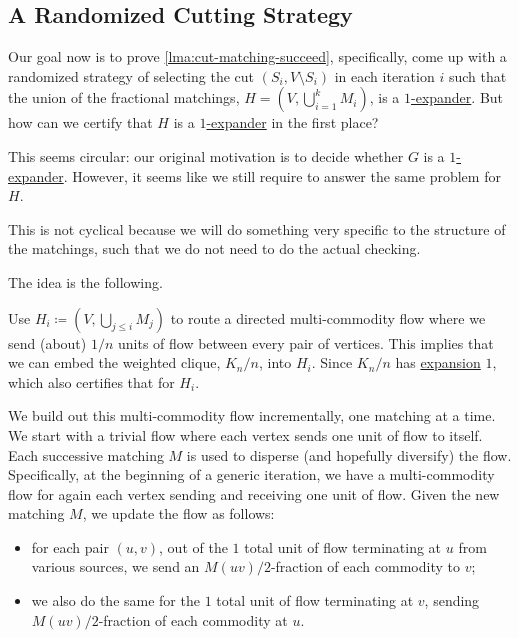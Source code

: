 \subsection{A Randomized Cutting Strategy}
Our goal now is to prove \autoref{lma:cut-matching-succeed}, specifically, come up with a randomized strategy of selecting the cut \((S_i, V\setminus S_i)\) in each iteration \(i\) such that the union of the fractional matchings, \(H = (V, \bigcup_{i=1}^{k} M_i)\), is a \hyperref[def:expander]{\(1\)-expander}. But how can we certify that \(H\) is a \hyperref[def:expander]{\(1\)-expander} in the first place?

\begin{problem*}
	This seems circular: our original motivation is to decide whether \(G\) is a \hyperref[def:expander]{\(1\)-expander}. However, it seems like we still require to answer the same problem for \(H\).
\end{problem*}
\begin{answer}
	This is not cyclical because we will do something very specific to the structure of the matchings, such that we do not need to do the actual checking.
\end{answer}

The idea is the following.

\begin{intuition}
	Use \(H_i \coloneqq (V, \bigcup_{j \leq i} M_j)\) to route a directed multi-commodity flow where we send (about) \(1 / n\) units of flow between every pair of vertices. This implies that we can embed the weighted clique, \(K_n / n\), into \(H_i\). Since \(K_n / n\) has \hyperref[def:expansion]{expansion} \(1\), which also certifies that for \(H_i\).
\end{intuition}

We build out this multi-commodity flow incrementally, one matching at a time. We start with a trivial flow where each vertex sends one unit of flow to itself. Each successive matching \(M\) is used to disperse (and hopefully diversify) the flow. Specifically, at the beginning of a generic iteration, we have a multi-commodity flow for again each vertex sending and receiving one unit of flow. Given the new matching \(M\), we update the flow as follows:
\begin{itemize}
	\item for each pair \((u, v)\), out of the \(1\) total unit of flow terminating at \(u\) from various sources, we send an \(M(uv) / 2\)-fraction of each commodity to \(v\);
	\item we also do the same for the \(1\) total unit of flow terminating at \(v\), sending \(M(uv) / 2\)-fraction of each commodity at \(u\).
\end{itemize}

